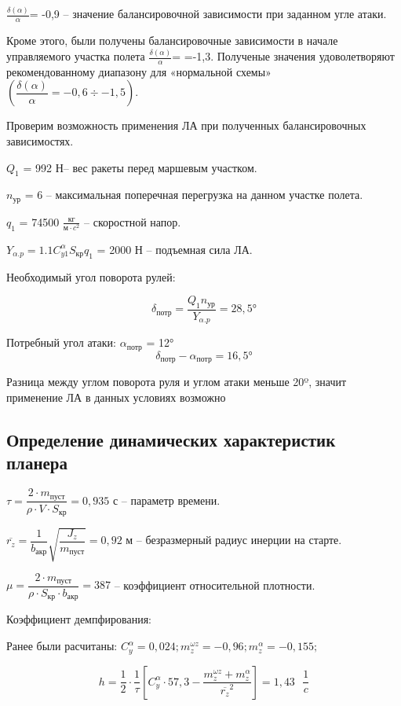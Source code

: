$ \frac{\delta(\alpha)}{\alpha} $= -0,9 – значение балансировочной зависимости при заданном угле атаки.

Кроме этого, были получены балансировочные зависимости в начале управляемого участка полета  $\frac{\delta(\alpha)}{\alpha}$= =-1,3. Полученые значения удоволетворяют рекомендованному диапазону для «нормальной схемы» $\left( \dfrac{\delta(\alpha)}{\alpha}=-0,6 \div -1,5 \right) $.

Проверим возможность применения ЛА при полученных балансировочных зависимостях.

$Q_1 $ = 992 Н– вес ракеты перед маршевым участком.

$n_\text{ур}$ = 6 – максимальная поперечная перегрузка на данном участке полета.

$q_1$ = 74500  $\frac{\text{кг}}{м \cdot c^2} $ – скоростной напор.

$Y_{\alpha.p}=1.1 C_{y1}^\alpha S_\text{кр} q_1 $ = 2000 Н – подъемная сила ЛА.

Необходимый угол поворота рулей:

$$\delta_\text{потр} = \dfrac{Q_1 n_\text{ур}}{Y_{\alpha.p}} = 28,5\text{°}$$

Потребный угол атаки: $\alpha_\text{потр} $ = 12°
$$\delta_\text{потр}-\alpha_\text{потр} = 16,5\text{°}$$

Разница между углом поворота руля и углом атаки меньше 20º, значит применение ЛА в данных условиях возможно

\clearpage
\subsection{Определение динамических характеристик планера}

$\tau= \dfrac {2 \cdot m_\text{пуст}} {\rho \cdot V \cdot S_\text{кр} }  = 0,935$ с – параметр времени.

$\overline{r_z} = \dfrac{1}{b_\text{акр}}  \sqrt{\dfrac{J_z} {m_\text{пуст}}}  = 0,92 $  м – безразмерный радиус инерции на старте.

$\mu= \dfrac{ 2 \cdot m_\text{пуст}} {\rho \cdot S_\text{кр} \cdot b_\text{акр} }  = 387$ – коэффициент относительной плотности.

Коэффициент демпфирования:

Ранее были расчитаны: $C_y^\alpha=0,024; m_z^{\omega z} = -0,96; m_z^\alpha = -0,155;$

$$h= \dfrac{1}{2} \cdot \dfrac{1}{\tau} \left[C_y^\alpha \cdot 57,3- \dfrac{m_z^{\omega z}+m_z^\alpha} {\overline{r_z}^2} \right]=1,43 \text{ }  \dfrac{1}{c} $$

